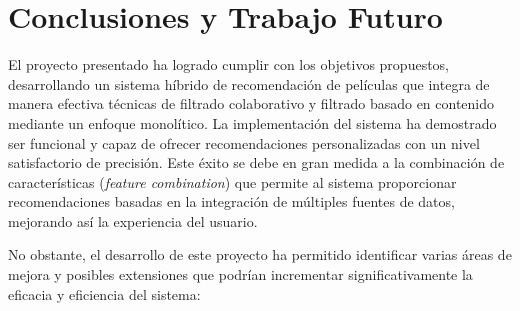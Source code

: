 \documentclass{llncs}
\begin{document}
	\section{Conclusiones y Trabajo Futuro}
	El proyecto presentado ha logrado cumplir con los objetivos propuestos, desarrollando un sistema híbrido de recomendación de películas que integra de manera efectiva técnicas de filtrado colaborativo y filtrado basado en contenido mediante un enfoque monolítico. La implementación del sistema ha demostrado ser funcional y capaz de ofrecer recomendaciones personalizadas con un nivel satisfactorio de precisión. Este éxito se debe en gran medida a la combinación de características (\textit{feature combination}) que permite al sistema proporcionar recomendaciones basadas en la integración de múltiples fuentes de datos, mejorando así la experiencia del usuario.
	
	No obstante, el desarrollo de este proyecto ha permitido identificar varias áreas de mejora y posibles extensiones que podrían incrementar significativamente la eficacia y eficiencia del sistema:
	
\end{document}
